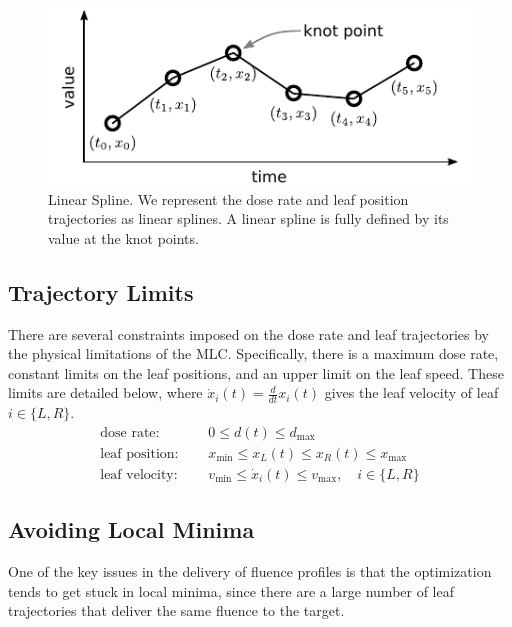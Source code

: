 \begin{figure}
  \centering
  \includegraphics{fig/linearSpline.pdf}
  \caption{Linear Spline. We represent the dose rate and leaf position trajectories as linear
           splines. A linear spline is fully defined by its value at the knot points. }
  \label{fig:linearSpline}
\end{figure}

\subsection{Trajectory Limits}

There are several constraints imposed on the dose rate and leaf trajectories
by the physical limitations of the MLC. Specifically, there is a maximum dose rate,
constant limits on the leaf positions, and an upper limit on the leaf speed.
These limits are detailed below, where $\dot{x}_i(t) = \tfrac{d}{dt}x_i(t)$ gives the leaf velocity of leaf $i\in\{L,R\}$.
\begin{align}
  \text{dose rate: }& \quad 0 \leq d(t) \leq d_\text{max}
      \label{eqn:FirstTrajectoryConstraint}\\
  \text{leaf position: }& \quad x_\text{min} \leq x_L(t) \leq x_R(t) \leq x_\text{max} \\
  \text{leaf velocity: }& \quad v_\text{min} \leq \dot{x}_i(t) \leq v_\text{max}, \quad i \in\{L,R\}
      \label{eqn:LastTrajectoryConstraint}
\end{align}

\subsection{Avoiding Local Minima}

One of the key issues in the delivery of fluence profiles is that the
optimization tends to get stuck in local minima,
since there are a large number of leaf trajectories that deliver the same fluence to the target.

